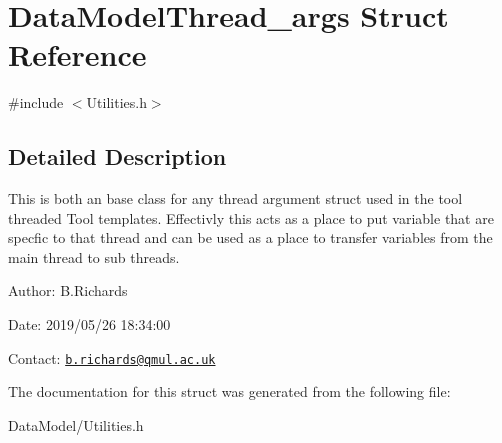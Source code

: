 \hypertarget{structDataModelThread__args}{\section{Data\-Model\-Thread\-\_\-args Struct Reference}
\label{structDataModelThread__args}
}


{\ttfamily \#include $<$Utilities.\-h$>$}



\subsection{Detailed Description}
This is both an base class for any thread argument struct used in the tool threaded Tool templates. Effectivly this acts as a place to put variable that are specfic to that thread and can be used as a place to transfer variables from the main thread to sub threads.

\begin{DoxyParagraph}{Author\-:}
B.\-Richards 
\end{DoxyParagraph}
\begin{DoxyParagraph}{Date\-:}
2019/05/26 18\-:34\-:00 
\end{DoxyParagraph}
Contact\-: \href{mailto:b.richards@qmul.ac.uk}{\tt b.\-richards@qmul.\-ac.\-uk} 

The documentation for this struct was generated from the following file\-:\begin{DoxyCompactItemize}
\item 
Data\-Model/Utilities.\-h\end{DoxyCompactItemize}
